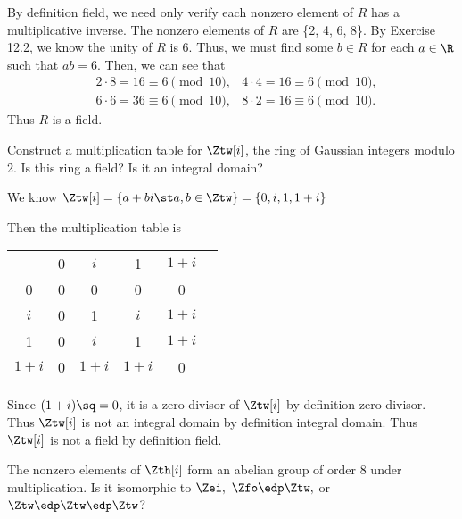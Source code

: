 \documentclass{article}
\begin{document}
\begin{solution} %
  By definition field, we need only verify each nonzero element of \( R \) has a multiplicative inverse. The nonzero elements of \( R \) are \{2, 4, 6, 8\}. By Exercise 12.2, we know the unity of \( R \) is 6. Thus, we must find some \( b\in R \) for each \( a\in\R \) such that \( ab = 6 \). Then, we can see that \begin{align*}
    &2\cdot 8 = 16 \equiv 6 \pmod{10}, &4\cdot 4 = 16 \equiv 6 \pmod{10}, \\
    &6\cdot 6 = 36 \equiv 6 \pmod{10}, &8\cdot 2 = 16 \equiv 6 \pmod{10}.
  \end{align*}
  Thus \( R \) is a field.
\end{solution}

Construct a multiplication table for \( \Ztw[i] \), the ring of Gaussian integers modulo 2. Is this ring a field? Is it an integral domain?

\begin{solution} %
  We know \( \Ztw[i] = \{a+bi\st a,b\in\Ztw\} = \{0, i, 1, 1+i\} \)

  Then the multiplication table is
  \begin{center}
    \begin{tabular}{c | c c c c c}
                  & 0       & \( i \)   & 1         & \( 1+i \) \\ \cline{1-5}
        0         & 0       & 0         & 0         & 0  \\
        \( i \)   & 0       & 1         & \( i \)   & \( 1+i \)  \\
        1         & 0       & \( i \)   & 1         & \( 1+i \)  \\
        \( 1+i \) & 0       & \( 1+i \) & \( 1+i \) & 0
    \end{tabular}
  \end{center}
  Since \( (1+i)\sq = 0 \), it is a zero-divisor of \( \Ztw[i] \) by definition zero-divisor. Thus \( \Ztw[i] \) is not an integral domain by definition integral domain.
  Thus \( \Ztw[i] \) is not a field by definition field.
\end{solution}

The nonzero elements of \( \Zth[i] \) form an abelian group of order 8 under multiplication. Is it isomorphic to \( \Zei,\ \Zfo\edp\Ztw, \) or \( \Ztw\edp\Ztw\edp\Ztw \)?
\end{document}
